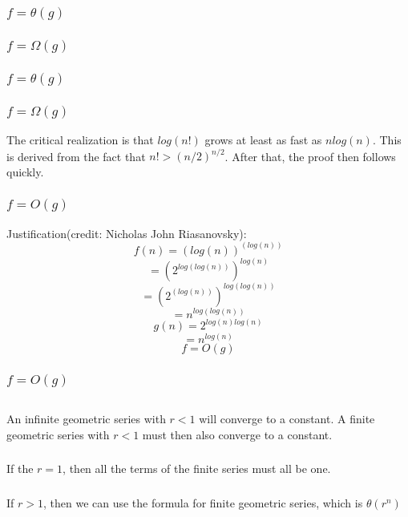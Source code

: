 \documentclass{article}
\begin{document}
\subsubsection{$f = \theta(g)$}
\subsubsection{$f = \Omega(g)$}
\subsubsection{$f = \theta(g)$}
\subsubsection{$f = \Omega(g)$}
The critical realization is that $log(n!)$ grows at least as fast as $nlog(n)$. This is derived from the fact that $n! > (n/2)^{n/2}$. After that, the proof then follows quickly. 
\subsubsection{$f = O(g)$}
Justification(credit: Nicholas John Riasanovsky): 
$$f(n)=(log(n))^{(log(n))}$$
$$=(2^{log(log(n))})^{log(n)}$$
$$=(2^{(log(n))})^{log(log(n))}$$
$$=n^{log(log(n))}$$
$$g(n)=2^{log(n)log(n)}$$
$$=n^{log(n)}$$
$$f=O(g)$$
\subsubsection{$f = O(g)$}
\subsection{}
\subsubsection{}An infinite geometric series with $r < 1$ will converge to a constant. A finite geometric series with $r < 1$ must then also converge to a constant. 
\subsubsection{}If the $r=1$, then all the terms of the finite series must all be one. 
\subsubsection{}If $r > 1$, then we can use the formula for finite geometric series, which is $\theta(r^n)$
\subsection{}
\end{document}

